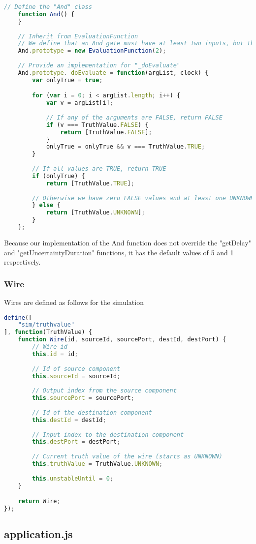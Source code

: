 \begin{lstlisting}[language=JavaScript]
	// Define the "And" class
    function And() {
    }
    
    // Inherit from EvaluationFunction
    // We define that an And gate must have at least two inputs, but there is no upper bound (we can simulate n-input AND gates)
    And.prototype = new EvaluationFunction(2);
    
    // Provide an implementation for "_doEvaluate"
    And.prototype._doEvaluate = function(argList, clock) {
        var onlyTrue = true;

        for (var i = 0; i < argList.length; i++) {
            var v = argList[i];
            
            // If any of the arguments are FALSE, return FALSE
            if (v === TruthValue.FALSE) {
                return [TruthValue.FALSE];
            }
            onlyTrue = onlyTrue && v === TruthValue.TRUE;
        }
		
		// If all values are TRUE, return TRUE
        if (onlyTrue) {
            return [TruthValue.TRUE];
        
		// Otherwise we have zero FALSE values and at least one UNKNOWN value, so the output is UNKNOWN        
        } else { 
            return [TruthValue.UNKNOWN];
        }
    };
\end{lstlisting}

Because our implementation of the And function does not override the "getDelay" and "getUncertaintyDuration" functions, it has the default values of 5 and 1 respectively.

\subsubsection{Wire}
Wires are defined as follows for the simulation

\begin{lstlisting}[language=JavaScript]
define([
    "sim/truthvalue"
], function(TruthValue) {
    function Wire(id, sourceId, sourcePort, destId, destPort) {
		// Wire id    
        this.id = id;
        
        // Id of source component
        this.sourceId = sourceId;
        
        // Output index from the source component
        this.sourcePort = sourcePort;
        
        // Id of the destination component
        this.destId = destId;
        
        // Input index to the destination component
        this.destPort = destPort;
        
        // Current truth value of the wire (starts as UNKNOWN)
        this.truthValue = TruthValue.UNKNOWN;
        
        this.unstableUntil = 0;
    }

    return Wire;
});
\end{lstlisting}

\subsection{application.js}